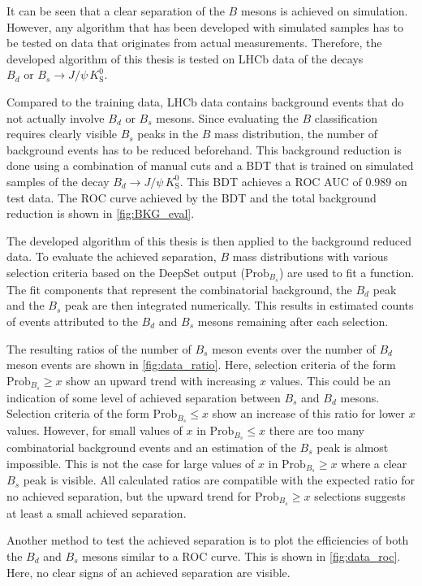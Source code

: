 It can be seen that a clear separation of the $B$ mesons is achieved on simulation.
However, any algorithm that has been developed with simulated samples has to be tested on data that originates from actual measurements. 
Therefore, the developed algorithm of this thesis is tested on LHCb data of the decays $B_d \text{ or } B_s \rightarrow J/\psi \, K^0_\text{S}$.

Compared to the training data, LHCb data contains background events that do not actually involve $B_d$ or $B_s$ mesons.
Since evaluating the $B$ classification requires clearly visible $B_s$ peaks in the $B$ mass distribution, the number of background events has to be reduced beforehand.
This background reduction is done using a combination of manual cuts and a BDT that is trained on simulated samples of the decay $B_d \rightarrow J/\psi \, K^0_\text{S}$.
This BDT achieves a ROC AUC of $0.989$ on test data.
The ROC curve achieved by the BDT and the total background reduction is shown in \cref{fig:BKG_eval}.

The developed algorithm of this thesis is then applied to the background reduced data.
To evaluate the achieved separation, $B$ mass distributions with various selection criteria based on the DeepSet output ($\text{Prob}_{B_s}$) are used to fit a function.
The fit components that represent the combinatorial background, the $B_d$ peak and the $B_s$ peak are then integrated numerically.
This results in estimated counts of events attributed to the $B_d$ and $B_s$ mesons remaining after each selection.

The resulting ratios of the number of $B_s$ meson events over the number of $B_d$ meson events are shown in \cref{fig:data_ratio}.
Here, selection criteria of the form $\text{Prob}_{B_s} \geq x$ show an upward trend with increasing $x$ values.
This could be an indication of some level of achieved separation between $B_s$ and $B_d$ mesons.
Selection criteria of the form $\text{Prob}_{B_s} \leq x$ show an increase of this ratio for lower $x$ values.
However, for small values of $x$ in $\text{Prob}_{B_s} \leq x$ there are too many combinatorial background events and an estimation of the $B_s$ peak is almost impossible. 
This is not the case for large values of $x$ in $\text{Prob}_{B_s} \geq x$ where a clear $B_s$ peak is visible.
All calculated ratios are compatible with the expected ratio for no achieved separation, but the upward trend for $\text{Prob}_{B_s} \geq x$ selections suggests at least a small achieved separation.

Another method to test the achieved separation is to plot the efficiencies of both the $B_d$ and $B_s$ mesons similar to a ROC curve.
This is shown in \cref{fig:data_roc}.
Here, no clear signs of an achieved separation are visible.

